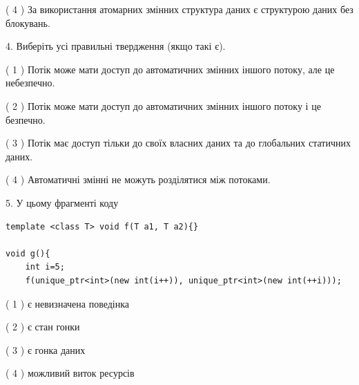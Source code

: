 \documentclass[12pt, ukrainian]{article}
\begin{document}
\begin {large}
{( 4 ) За використання атомарних змінних структура даних є структурою даних без блокувань.%


4. Виберіть усі правильні твердження (якщо такі є).\par
\vspace{2mm}

( 1 ) Потік може мати доступ до автоматичних змінних іншого потоку, але це небезпечно.%

( 2 ) Потік може мати доступ до автоматичних змінних іншого потоку і це безпечно.%

( 3 ) Потік має доступ тільки до своїх власних даних та до глобальних статичних даних.%

( 4 ) Автоматичні змінні не можуть розділятися між потоками.%


5. У цьому фрагменті коду
\begin{verbatim}
template <class T> void f(T a1, T a2){}

void g(){
    int i=5;
    f(unique_ptr<int>(new int(i++)), unique_ptr<int>(new int(++i)));
\end{verbatim}

( 1 ) є невизначена поведінка%

( 2 ) є стан гонки%

( 3 ) є гонка даних%

( 4 ) можливий виток ресурсів%
}
\end {large}
\end{document}
